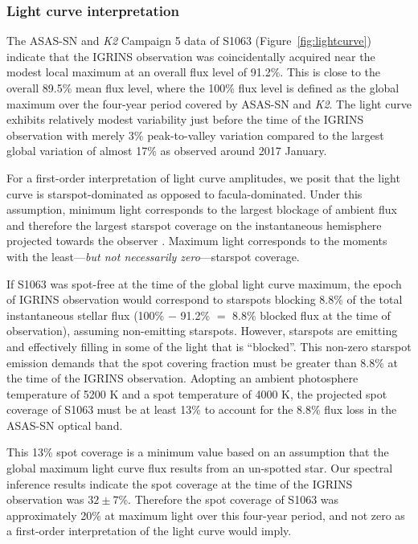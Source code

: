 \documentclass[twocolumn,tighten]{aastex631}
\begin{document}
\subsubsection{Light curve interpretation}
\label{sec:lightcurveinterp}
The ASAS-SN and \textit{K2} Campaign 5 data of S1063 (Figure~\ref{fig:lightcurve}) indicate that the IGRINS observation was coincidentally acquired near the modest local maximum at an overall flux level of 91.2\%. This is close to the overall 89.5\% mean flux level, where the 100\% flux level is defined as the global maximum over the four-year period covered by ASAS-SN and \textit{K2}. The light curve exhibits relatively modest variability just before the time of the IGRINS observation with merely 3\% peak-to-valley variation compared to the largest global variation of almost 17\% as observed around 2017 January.  

For a first-order interpretation of light curve amplitudes, we posit that the light curve is starspot-dominated as opposed to facula-dominated.  Under this assumption, minimum light corresponds to the largest blockage of ambient flux and therefore the largest starspot coverage on the instantaneous hemisphere projected towards the observer \citep{basri18}.  Maximum light corresponds to the moments with the least---\emph{but not necessarily zero}---starspot coverage.  

If S1063 was spot-free at the time of the global light curve maximum, the epoch of IGRINS observation would correspond to starspots blocking 8.8\% of the total instantaneous stellar flux (100\% $-$ 91.2\% $=$ 8.8\% blocked flux at the time of observation), assuming non-emitting starspots. However, starspots are emitting and effectively filling in some of the light that is ``blocked''.  This non-zero starspot emission demands that the spot covering fraction must be greater than 8.8\% at the time of the IGRINS observation. Adopting an ambient photosphere temperature of 5200 K and a spot temperature of 4000 K, the projected spot coverage of S1063 must be at least 13\% to account for the 8.8\% flux loss in the ASAS-SN optical band. 

This 13\% spot coverage is a minimum value based on an assumption that the global maximum light curve flux results from an un-spotted star. Our spectral inference results indicate the spot coverage at the time of the IGRINS observation was $32\pm7$\%.  Therefore the spot coverage of S1063 was approximately 20\% at maximum light over this four-year period, and not zero as a first-order interpretation of the light curve would imply. 
\end{document}
